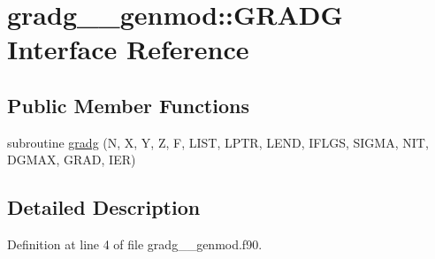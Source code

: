 \hypertarget{interfacegradg____genmod_1_1GRADG}{\section{gradg\+\_\+\+\_\+genmod\+:\+:G\+R\+A\+D\+G Interface Reference}
\label{interfacegradg____genmod_1_1GRADG}
}
\subsection*{Public Member Functions}
\begin{DoxyCompactItemize}
\item 
subroutine \hyperlink{interfacegradg____genmod_1_1GRADG_a6e5f141c560be9856a786d7e877cdf06}{gradg} (N, X, Y, Z, F, L\+I\+S\+T, L\+P\+T\+R, L\+E\+N\+D, I\+F\+L\+G\+S, S\+I\+G\+M\+A, N\+I\+T, D\+G\+M\+A\+X, G\+R\+A\+D, I\+E\+R)
\end{DoxyCompactItemize}


\subsection{Detailed Description}


Definition at line 4 of file gradg\+\_\+\+\_\+genmod.\+f90.



